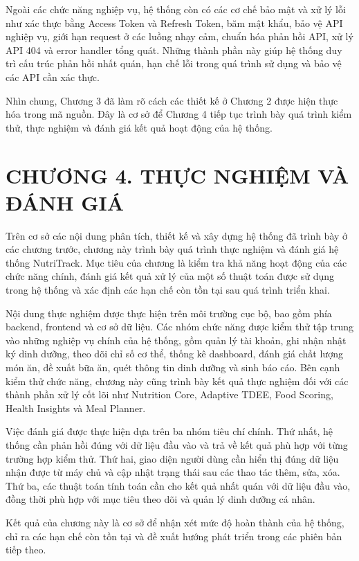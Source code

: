 Ngoài các chức năng nghiệp vụ, hệ thống còn có các cơ chế bảo mật và xử lý lỗi như xác thực bằng Access Token và Refresh Token, băm mật khẩu, bảo vệ API nghiệp vụ, giới hạn request ở các luồng nhạy cảm, chuẩn hóa phản hồi API, xử lý API 404 và error handler tổng quát. Những thành phần này giúp hệ thống duy trì cấu trúc phản hồi nhất quán, hạn chế lỗi trong quá trình sử dụng và bảo vệ các API cần xác thực.

Nhìn chung, Chương 3 đã làm rõ cách các thiết kế ở Chương 2 được hiện thực hóa trong mã nguồn. Đây là cơ sở để Chương 4 tiếp tục trình bày quá trình kiểm thử, thực nghiệm và đánh giá kết quả hoạt động của hệ thống.




\chapter*{CHƯƠNG 4. THỰC NGHIỆM VÀ ĐÁNH GIÁ}
Trên cơ sở các nội dung phân tích, thiết kế và xây dựng hệ thống đã trình bày ở các chương trước, chương này trình bày quá trình thực nghiệm và đánh giá hệ thống NutriTrack. Mục tiêu của chương là kiểm tra khả năng hoạt động của các chức năng chính, đánh giá kết quả xử lý của một số thuật toán được sử dụng trong hệ thống và xác định các hạn chế còn tồn tại sau quá trình triển khai.

Nội dung thực nghiệm được thực hiện trên môi trường cục bộ, bao gồm phía backend, frontend và cơ sở dữ liệu. Các nhóm chức năng được kiểm thử tập trung vào những nghiệp vụ chính của hệ thống, gồm quản lý tài khoản, ghi nhận nhật ký dinh dưỡng, theo dõi chỉ số cơ thể, thống kê dashboard, đánh giá chất lượng món ăn, đề xuất bữa ăn, quét thông tin dinh dưỡng và sinh báo cáo. Bên cạnh kiểm thử chức năng, chương này cũng trình bày kết quả thực nghiệm đối với các thành phần xử lý cốt lõi như Nutrition Core, Adaptive TDEE, Food Scoring, Health Insights và Meal Planner.

Việc đánh giá được thực hiện dựa trên ba nhóm tiêu chí chính. Thứ nhất, hệ thống cần phản hồi đúng với dữ liệu đầu vào và trả về kết quả phù hợp với từng trường hợp kiểm thử. Thứ hai, giao diện người dùng cần hiển thị đúng dữ liệu nhận được từ máy chủ và cập nhật trạng thái sau các thao tác thêm, sửa, xóa. Thứ ba, các thuật toán tính toán cần cho kết quả nhất quán với dữ liệu đầu vào, đồng thời phù hợp với mục tiêu theo dõi và quản lý dinh dưỡng cá nhân.

Kết quả của chương này là cơ sở để nhận xét mức độ hoàn thành của hệ thống, chỉ ra các hạn chế còn tồn tại và đề xuất hướng phát triển trong các phiên bản tiếp theo.

